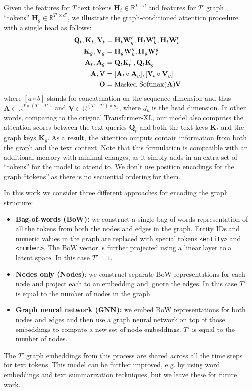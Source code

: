 \documentclass[11pt]{article}
\begin{document}
Given the features for $T$ text tokens $\mathbf{H}_t \in \mathbb{R}^{T \times d}$ and features for $T'$ graph ``tokens'' $\mathbf{H}_g \in \mathbb{R}^{T' \times d'}$, we illustrate the graph-conditioned attention procedure with a single head as follows:
\begin{align*}\label{eq1}
  \mathbf{Q}_t, \mathbf{K}_t, \mathbf{V}_t &= \mathbf{H}_t\mathbf{W}^t_q, \mathbf{H}_t\mathbf{W}^t_k, \mathbf{H}_t\mathbf{W}^t_v \\
  \mathbf{K}_g, \mathbf{V}_g &= \mathbf{H}_g\mathbf{W}^g_k, \mathbf{H}_g\mathbf{W}^g_v \\
\mathbf{A}_t, \mathbf{A}_g & = \mathbf{Q}_t\mathbf{K}_t^\top,  \mathbf{Q}_t \mathbf{K}_g^\top \\
  \mathbf{A}, \mathbf{V} & = [\mathbf{A}_t \circ  \mathbf{A}_g], [\mathbf{V}_t \circ  \mathbf{V}_g] \\
  \mathbf{O} & = \textup{Masked-Softmax}(\mathbf{A}) \mathbf{V}
\end{align*}
where $[a \circ b]$ stands for concatenation on the sequence dimension and thus $\mathbf{A} \in \mathbb{R}^{T \times (T + T')}$ and $\mathbf{V} \in \mathbb{R}^{(T + T') \times d_h }$, where $d_h$ is the head dimension.
In other words, comparing to the original Transformer-XL, our model also computes the attention scores between the text queries $\mathbf{Q}_t$ and both the text keys $\mathbf{K}_t$ and the graph keys $\mathbf{K}_g$.
As a result, the attention outputs contain information from both the graph and the text context. Note that this formulation is compatible with an additional memory \cite{dai2019transformer} with minimal changes, as it simply adds in an extra set of ``tokens'' for the model to attend to.  We don't use position encodings for the graph ``tokens'' as there is no sequential ordering for them.


In this work we consider three different approaches for encoding the graph structure:
\begin{itemize}
    \item \textbf{Bag-of-words (BoW):}
we construct a single bag-of-words representation of all the tokens from both the nodes and edges in the graph.
Entity IDs and numeric values in the graph are replaced with special tokens \texttt{<entity>} and \texttt{<number>}. The BoW vector is further projected using a linear layer to a latent space. In this case $T'=1$.
    \item \textbf{Nodes only (Nodes)}: we construct separate BoW representations for each node and project each to an embedding and ignore the edges. In this case $T'$ is equal to the number of nodes in the graph.
    \item \textbf{Graph neural network (GNN):} we embed BoW representations for both nodes and edges and then use a graph neural network  \cite{battaglia2018relational} on top of those embeddings to compute a new set of node embeddings. $T'$ is equal to the number of nodes.
\end{itemize}
The $T'$ graph embeddings from this process are shared across all the time steps for text tokens.
This model can be further improved, e.g. by using word embeddings and text summarization techniques, but we leave these for future work.
\end{document}
